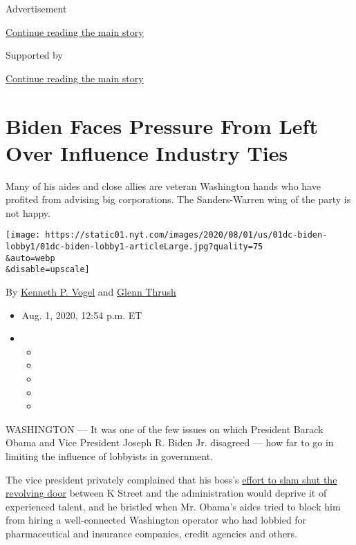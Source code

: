 Advertisement

\protect\hyperlink{after-top}{Continue reading the main story}

Supported by

\protect\hyperlink{after-sponsor}{Continue reading the main story}

\hypertarget{biden-faces-pressure-from-left-over-influence-industry-ties}{%
\section{Biden Faces Pressure From Left Over Influence Industry
Ties}\label{biden-faces-pressure-from-left-over-influence-industry-ties}}

Many of his aides and close allies are veteran Washington hands who have
profited from advising big corporations. The Sanders-Warren wing of the
party is not happy.

\texttt{[image: https://static01.nyt.com/images/2020/08/01/us/01dc-biden-lobby1/01dc-biden-lobby1-articleLarge.jpg?quality=75\\\&auto=webp\\\&disable=upscale]}

By \href{https://www.nytimes.com/by/kenneth-p-vogel}{Kenneth P. Vogel}
and \href{https://www.nytimes.com/by/glenn-thrush}{Glenn Thrush}

\begin{itemize}
\item
  Aug. 1, 2020, 12:54 p.m. ET
\item
  \begin{itemize}
  \item
  \item
  \item
  \item
  \item
  \end{itemize}
\end{itemize}

WASHINGTON --- It was one of the few issues on which President Barack
Obama and Vice President Joseph R. Biden Jr. disagreed --- how far to go
in limiting the influence of lobbyists in government.

The vice president privately complained that his boss's
\href{https://www.nytimes.com/2009/01/22/us/politics/22obama.html}{effort
to slam shut the revolving door} between K Street and the administration
would deprive it of experienced talent, and he bristled when Mr. Obama's
aides tried to block him from hiring a well-connected Washington
operator who had lobbied for pharmaceutical and insurance companies,
credit agencies and others.

